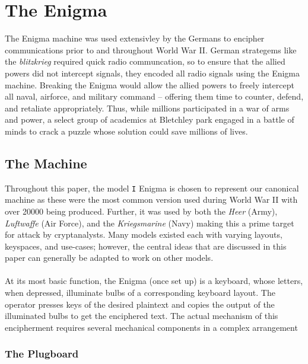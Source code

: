 \chapter{The Enigma}


The Enigma machine was used extensivley by the Germans to encipher
communications prior to and throughout World War II. German
strategems like the \emph{blitzkrieg} required quick radio
communcation, so to ensure that the allied powers did not intercept
signals, they encoded all radio signals using the Enigma machine.
Breaking the Enigma would allow the allied powers to freely intercept
all naval, airforce, and military command -- offering them time to
counter, defend, and retaliate appropriately. Thus, while millions
participated in a war of arms and power, a select group of academics
at Bletchley park engaged in a battle of minds to crack a puzzle
whose solution could save millions of lives.

\section{The Machine}
Throughout this paper, the model \texttt{I} Enigma is chosen to
represent our canonical machine as these were the most common version
used during World War II with over 20000 being produced. Further, it
was used by both the \emph{Heer} (Army), \emph{Luftwaffe} (Air
Force), and the \emph{Kriegsmarine} (Navy) making this a prime target
for attack by cryptanalysts. Many models existed each with varying
layouts, keyspaces, and use-cases; however, the central ideas that
are discussed in this paper can generally be adapted to work on other models.
\\\\At its most basic function, the Enigma (once set up) is a
keyboard, whose letters, when depressed, illuminate bulbs of a
corresponding keyboard layout. The operator presses keys of the
desired plaintext and copies the output of the illuminated bulbs to
get the enciphered text. The actual mechanism of this encipherment
requires several mechanical components in a complex arrangement

\subsection{The Plugboard}

